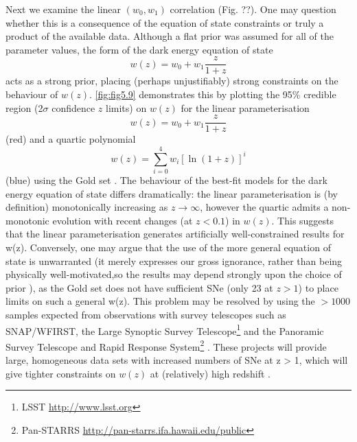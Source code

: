 Next we examine the linear $(w_0 , w_1)$ correlation (Fig. ??). One may question whether this is a consequence of the equation of state constraints or truly a product of the available data. Although a flat prior was assumed for all of the parameter values, the form of the dark energy equation of state 
\begin{equation*}
    w(z) = w_0 + w_1 \frac{z}{1+z} 
\end{equation*}
acts as a strong prior, placing (perhaps unjustifiably) strong constraints on the behaviour of $w(z)$. \cref{fig:fig5.9} demonstrates this by plotting the 95\% credible region (2$\sigma$ confidence $z$ limits) on $w(z)$ for the linear parameterisation 
\begin{equation*}
    w(z) = w_0 + w_1 \frac{z}{1+z} 
\end{equation*}
(red) and a quartic polynomial 
\begin{equation*}
    w(z) = \sum_{i=0}^{4} w_i \left[ \ln(1+z) \right]^i
\end{equation*}
(blue) using the Gold set \cite{Riess2007}. The behaviour of the best-fit models for the dark energy equation of state 
differs dramatically: the linear parameterisation is (by definition) monotonically increasing as $z \rightarrow{} \infty{}$, however the quartic admits a non-monotonic evolution with recent changes (at $z < 0.1$) in $w(z)$. This suggests that the linear parameterisation generates artificially well-constrained results for w(z). Conversely, one may argue that the use of the more general equation of state is unwarranted (it merely expresses our gross ignorance, rather than being physically well-motivated,so the results may depend strongly upon the choice of prior \cite{Efstathiou2008}), as the Gold set does not have sufficient SNe (only 23 at $z > 1$) \cite{Riess2007} to place limits on such a general w(z). This problem may be resolved by using the $> 1000$ samples expected from observations with survey telescopes such as SNAP/WFIRST, the Large Synoptic Survey Telescope\footnote{LSST \url{http://www.lsst.org}} and the Panoramic Survey Telescope and Rapid Response System\footnote{Pan-STARRS \url{http://pan-starrs.ifa.hawaii.edu/public}} \cite{Leibundgut2008}. These projects will provide large, homogeneous data sets with increased numbers of SNe at z > 1, which will give tighter constraints on $w(z)$ at (relatively) high redshift \cite{Leibundgut2008}.

